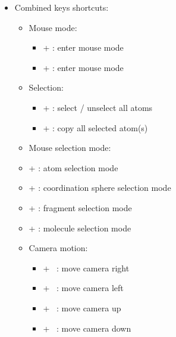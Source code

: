 {\begin{itemize}
\begin{itemize}
\begin{itemize}
\item[] \DArrow\ : rotate down 
\end{itemize}
\item Misc:
\begin{itemize}
\item[] \Esc\ : exit fullscreen mode
\item[] \Spacebar\ : pause / restart spinning
\end{itemize}
\end{itemize}
\newpage
\item Combined keys shortcuts:
\begin{itemize}
\item Mouse mode:
\begin{itemize}
\item[] \Alt +  : enter mouse  mode
\item[] \Alt +  : enter mouse  mode 
\end{itemize}
\item Selection:
\begin{itemize}
\item[] \Ctrl +  : select / unselect all atoms
\item[] \Ctrl +  : copy all selected atom(s)
\end{itemize}
\item Mouse selection mode:
\item[] \Shift +  : atom selection mode
\item[] \Shift +  : coordination sphere selection mode
\item[] \Shift +  : fragment selection mode
\item[] \Shift +  : molecule selection mode 
\item Camera motion:
\begin{itemize}
\item[] \Ctrl + \RArrow\ : move camera right
\item[] \Ctrl + \LArrow\ : move camera left
\item[] \Ctrl + \UArrow\ : move camera up
\item[] \Ctrl + \DArrow\ : move camera down

\end{itemize}
\end{itemize}
\end{itemize}}
